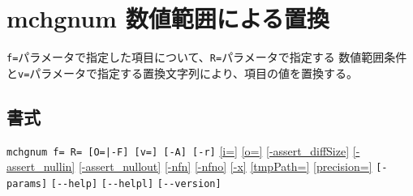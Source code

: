 
%

\section{mchgnum 数値範囲による置換\label{sect:mchgnum}}
\verb|f=|パラメータで指定した項目について、\verb|R=|パラメータで指定する
数値範囲条件と\verb|v=|パラメータで指定する置換文字列により、項目の値を置換する。

\subsection*{書式}
\verb/mchgnum f= R= [O=|-F] [v=] [-A] [-r]/
\hyperref[sect:option_i]{[i=]}
\hyperref[sect:option_o]{[o=]}
\hyperref[sect:option_assert_diffSize]{[-assert\_diffSize]}
\hyperref[sect:option_assert_nullin]{[-assert\_nullin]}
\hyperref[sect:option_assert_nullout]{[-assert\_nullout]}
\hyperref[sect:option_nfn]{[-nfn]} 
\hyperref[sect:option_nfno]{[-nfno]}
\hyperref[sect:option_x]{[-x]}
\hyperref[sect:option_option_tmppath]{[tmpPath=]}
\hyperref[sect:option_precision]{[precision=]}
\verb|[-params]|
\verb|[--help]|
\verb|[--helpl]|
\verb|[--version]|\\


